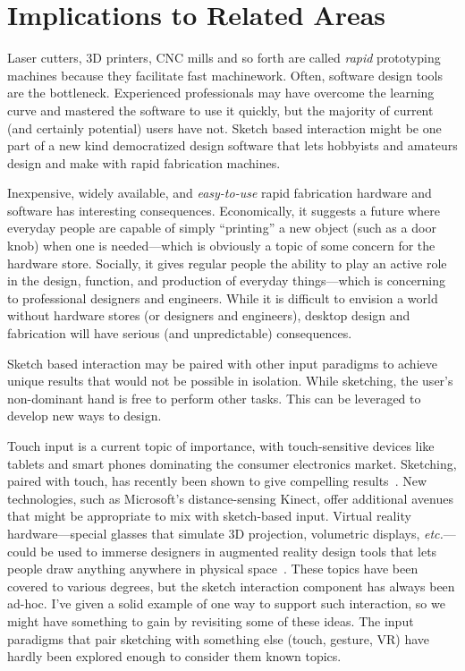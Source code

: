 \section{Implications to Related Areas}


Laser cutters, 3D printers, CNC mills and so forth are called
\textit{rapid} prototyping machines because they facilitate fast
machinework. Often, software design tools are the
bottleneck. Experienced professionals may have overcome the learning
curve and mastered the software to use it quickly, but the majority of
current (and certainly potential) users have not. Sketch based
interaction might be one part of a new kind democratized design
software that lets hobbyists and amateurs design and make with rapid
fabrication machines.

Inexpensive, widely available, and \textit{easy-to-use} rapid
fabrication hardware and software has interesting
consequences. Economically, it suggests a future where everyday people
are capable of simply ``printing'' a new object (such as a door knob)
when one is needed---which is obviously a topic of some concern for
the hardware store. Socially, it gives regular people the ability to
play an active role in the design, function, and production of
everyday things---which is concerning to professional designers and
engineers. While it is difficult to envision a world without hardware
stores (or designers and engineers), desktop design and fabrication
will have serious (and unpredictable) consequences.

Sketch based interaction may be paired with other input paradigms to
achieve unique results that would not be possible in isolation. While
sketching, the user's non-dominant hand is free to perform other
tasks. This can be leveraged to develop new ways to design. 

Touch input is a current topic of importance, with touch-sensitive
devices like tablets and smart phones dominating the consumer
electronics market. Sketching, paired with touch, has recently been
shown to give compelling results~\cite{hinckley-pen-touch}. New
technologies, such as Microsoft's distance-sensing Kinect, offer
additional avenues that might be appropriate to mix with sketch-based
input. Virtual reality hardware---special glasses that simulate 3D
projection, volumetric displays, \textit{etc.}---could be used to
immerse designers in augmented reality design tools that lets people
draw anything anywhere in physical space~\cite{jung-lightpen}. These
topics have been covered to various degrees, but the sketch
interaction component has always been ad-hoc. I've given a solid
example of one way to support such interaction, so we might have
something to gain by revisiting some of these ideas. The input
paradigms that pair sketching with something else (touch, gesture, VR)
have hardly been explored enough to consider them known topics.

